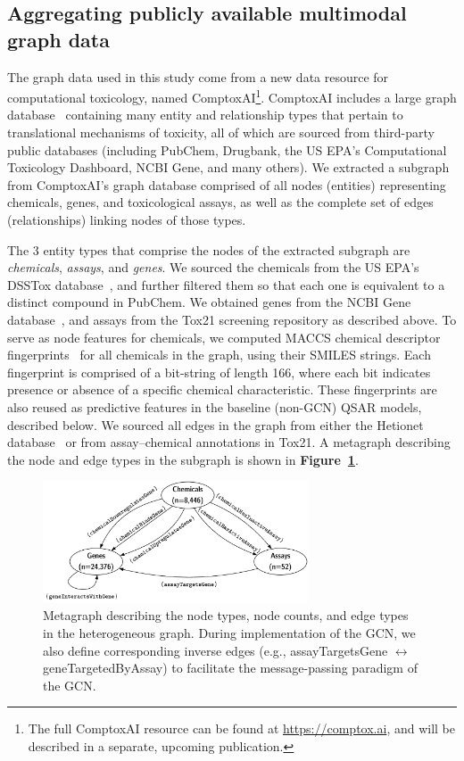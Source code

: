\documentclass{ws-procs11x85}
\begin{document}
\subsection{Aggregating publicly available multimodal graph data}
The graph data used in this study come from a new data resource for computational toxicology, named ComptoxAI\footnote{The full ComptoxAI resource can be found at \url{https://comptox.ai}, and will be described in a separate, upcoming publication.}.
ComptoxAI includes a large graph database~\cite{robinson2015graph} containing many entity and relationship types that pertain to translational mechanisms of toxicity, all of which are sourced from third-party public databases (including PubChem, Drugbank, the US EPA's Computational Toxicology Dashboard, NCBI Gene, and many others).
We extracted a subgraph from ComptoxAI's graph database comprised of all nodes (entities) representing chemicals, genes, and toxicological assays, as well as the complete set of edges (relationships) linking nodes of those types.

The 3 entity types that comprise the nodes of the extracted subgraph are \textit{chemicals}, \textit{assays}, and \textit{genes}.
We sourced the chemicals from the US EPA's DSSTox database~\cite{williams2017comptox}, and further filtered them so that each one is equivalent to a distinct compound in PubChem.
We obtained genes from the NCBI Gene database~\cite{brown2015gene}, and assays from the Tox21 screening repository as described above.
To serve as node features for chemicals, we computed MACCS chemical descriptor fingerprints~\cite{durant2002reoptimization} for all chemicals in the graph, using their SMILES strings.
Each fingerprint is comprised of a bit-string of length 166, where each bit indicates presence or absence of a specific chemical characteristic.
These fingerprints are also reused as predictive features in the baseline (non-GCN) QSAR models, described below.
We sourced all edges in the graph from either the Hetionet database~\cite{himmelstein2017systematic} or from assay--chemical annotations in Tox21.
A metagraph describing the node and edge types in the subgraph is shown in \textbf{Figure~\ref{fig:2}}.

\begin{figure}
   \centering
   \includegraphics[width=0.7\textwidth]{figures/figure1-1.pdf}
   \caption{Metagraph describing the node types, node counts, and edge types in the heterogeneous graph. During implementation of the GCN, we also define corresponding inverse edges (e.g., assayTargetsGene $\leftrightarrow$ geneTargetedByAssay) to facilitate the message-passing paradigm of the GCN.}\label{fig:2}
\end{figure}
\end{document}
